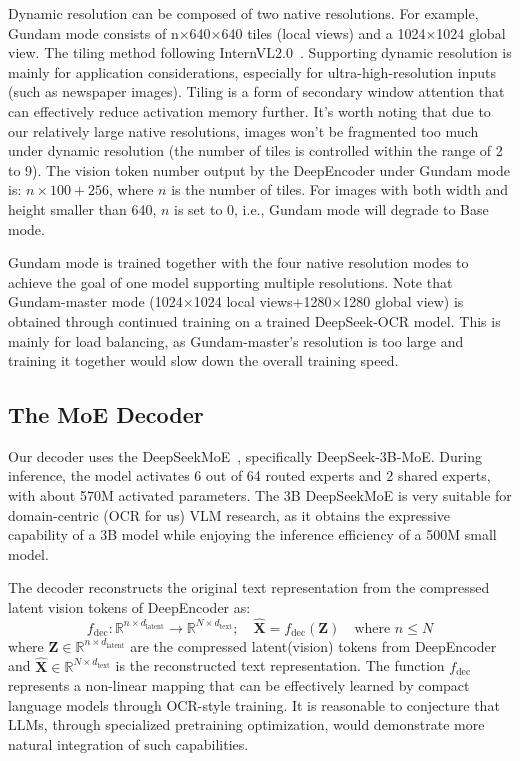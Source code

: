 \documentclass[11pt, a4paper, logo, copyright, nonumbering]{deepseek}
\begin{document}
\begin{CJK*}{UTF8}{gbsn}
Dynamic resolution can be composed of two native resolutions. For example, Gundam mode consists of n$\times$640$\times$640 tiles (local views) and a 1024$\times$1024 global view. The tiling method following InternVL2.0~\cite{chen2024internvl2}. Supporting dynamic resolution is mainly for application considerations, especially for ultra-high-resolution inputs (such as newspaper images). Tiling is a form of secondary window attention that can effectively reduce activation memory further. It's worth noting that due to our relatively large native resolutions, images won't be fragmented too much under dynamic resolution (the number of tiles is controlled within the range of 2 to 9). The vision token number output by the DeepEncoder under Gundam mode is: $n\times100+256$, where $n$ is the number of tiles. For images with both width and height smaller than 640, $n$ is set to 0, i.e., Gundam mode will degrade to Base mode. 

Gundam mode is trained together with the four native resolution modes to achieve the goal of one model supporting multiple resolutions. Note that Gundam-master mode (1024$\times$1024 local views+1280$\times$1280 global view) is obtained through continued training on a trained DeepSeek-OCR model. This is mainly for load balancing, as Gundam-master's resolution is too large and training it together would slow down the overall training speed.

\subsection{The MoE Decoder}

Our decoder uses the DeepSeekMoE~\cite{liu2024deepseekv2,liu2024deepseekv3}, specifically DeepSeek-3B-MoE. During inference, the model activates 6 out of 64 routed experts and 2 shared experts, with about 570M activated parameters. The 3B DeepSeekMoE is very suitable for domain-centric (OCR for us) VLM research, as it obtains the expressive capability of a 3B model while enjoying the inference efficiency of a 500M small model.

The decoder reconstructs the original text representation from the compressed latent vision tokens of DeepEncoder as:
\begin{equation}
f_{\text{dec}}: \mathbb{R}^{n \times d_{\text{latent}}} \rightarrow \mathbb{R}^{N \times d_{\text{text}}}; \quad \hat{\mathbf{X}} = f_{\text{dec}}(\mathbf{Z}) \quad \text{where } n \le N
\label{enq2}
\end{equation}
where $\mathbf{Z} \in \mathbb{R}^{n \times d_{\text{latent}}}$ are the compressed latent(vision) tokens from DeepEncoder and $\hat{\mathbf{X}} \in \mathbb{R}^{N \times d_{\text{text}}}$ is the reconstructed text representation. The function $f_{\text{dec}}$ represents a non-linear mapping that can be effectively learned by compact language models through OCR-style training. It is reasonable to conjecture that LLMs, through specialized pretraining optimization, would demonstrate more natural integration of such capabilities.



\end{CJK*}
\end{document}
